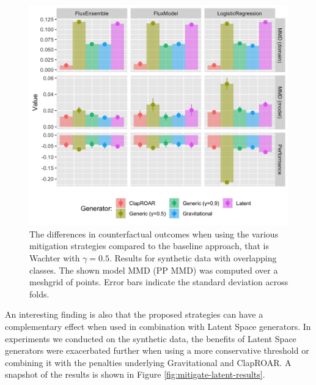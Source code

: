 \documentclass[conference,final,]{IEEEtran}
\begin{document}
\begin{figure}

{\centering \includegraphics[width=0.9\linewidth]{www/mitigation_synthetic_results} 

}

\caption{The differences in counterfactual outcomes when using the various mitigation strategies compared to the baseline approach, that is Wachter with $\gamma=0.5$. Results for synthetic data with overlapping classes. The shown model MMD (PP MMD) was computed over a meshgrid of points. Error bars indicate the standard deviation across folds.}\label{fig:mitigate-results}
\end{figure}

An interesting finding is also that the proposed strategies can have a complementary effect when used in combination with Latent Space generators. In experiments we conducted on the synthetic data, the benefits of Latent Space generators were exacerbated further when using a more conservative threshold or combining it with the penalties underlying Gravitational and ClapROAR. A snapshot of the results is shown in Figure \ref{fig:mitigate-latent-results}.
\end{document}
